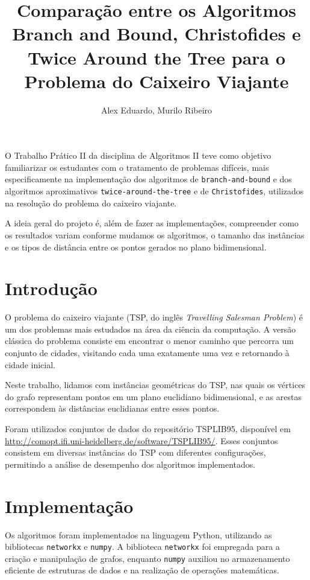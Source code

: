 \documentclass[12pt]{article}
\title{Comparação entre os Algoritmos Branch and Bound, Christofides e Twice Around the Tree para o Problema do Caixeiro Viajante}
\author{Alex Eduardo\inst{1}, Murilo Ribeiro\inst{2}}
\begin{document}
 

\maketitle

     
\begin{resumo} 
O Trabalho Prático II da disciplina de Algoritmos II teve como objetivo familiarizar os estudantes com o tratamento de problemas difíceis, mais especificamente na implementação dos algoritmos de \texttt{branch-and-bound} e dos algoritmos aproximativos \texttt{twice-around-the-tree} e de \texttt{Christofides}, utilizados na resolução do problema do caixeiro viajante.

A ideia geral do projeto é, além de fazer as implementações, compreender como os resultados variam conforme mudamos os algoritmos, o tamanho das instâncias e os tipos de distância entre os pontos gerados no plano bidimensional.
\end{resumo}


\section{Introdução}
O problema do caixeiro viajante (TSP, do inglês \textit{Travelling Salesman Problem}) é um dos problemas mais estudados na área da ciência da computação. A versão clássica do problema consiste em encontrar o menor caminho que percorra um conjunto de cidades, visitando cada uma exatamente uma vez e retornando à cidade inicial.

Neste trabalho, lidamos com instâncias geométricas do TSP, nas quais os vértices do grafo representam pontos em um plano euclidiano bidimensional, e as arestas correspondem às distâncias euclidianas entre esses pontos.

Foram utilizados conjuntos de dados do repositório TSPLIB95, disponível em \url{http://comopt.ifi.uni-heidelberg.de/software/TSPLIB95/}. Esses conjuntos consistem em diversas instâncias do TSP com diferentes configurações, permitindo a análise de desempenho dos algoritmos implementados.

\section{Implementação}

Os algoritmos foram implementados na linguagem Python, utilizando as bibliotecas \texttt{networkx} e \texttt{numpy}. A biblioteca \texttt{networkx} foi empregada para a criação e manipulação de grafos, enquanto \texttt{numpy} auxiliou no armazenamento eficiente de estruturas de dados e na realização de operações matemáticas.
\end{document}
